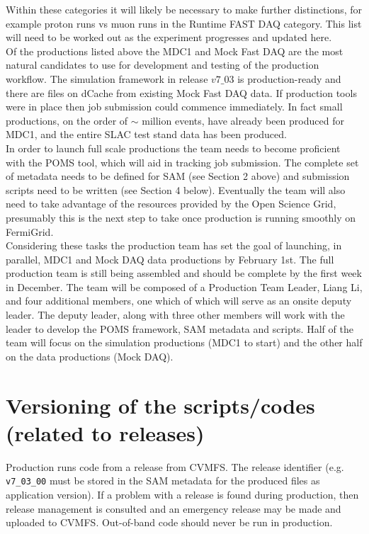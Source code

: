 \noindent Within these categories it will likely be necessary to make further distinctions, for example proton runs vs muon runs in the Runtime FAST DAQ category. This list will need to be worked out as the experiment progresses and updated here.\\

\noindent Of the productions listed above the MDC1 and Mock Fast DAQ are the most natural candidates to use for development and testing of the production workflow. The simulation framework in release $v7\_03$ is  production-ready and there are files on dCache from existing Mock Fast DAQ data.  If production tools were in place then job submission could commence immediately.  In  fact small productions, on the order of $\sim$ million events,  have already been produced for MDC1, and the entire SLAC test stand data has been produced.\\

\noindent In order to launch full scale productions the team needs to become proficient with the POMS tool, which will aid in tracking job submission.  The complete set of metadata needs to be defined for SAM (see Section 2 above) and submission scripts need to be written (see Section 4 below).  Eventually the team will also need to take advantage of the resources provided by the Open Science Grid, presumably this is the next step to take once production is running smoothly on FermiGrid.\\

\noindent Considering these tasks   the production team has set the goal of launching, in parallel, MDC1 and Mock DAQ data productions by February 1st.  The full production team is still being assembled and should be complete by the first week in December. The team will be composed of a Production Team Leader, Liang Li,  and four additional members, one which of which will serve as an onsite deputy leader.  The deputy leader, along with three other members will work with the leader to develop the POMS framework, SAM metadata and scripts. Half of the team will focus on the simulation productions (MDC1 to start) and the other half on the data productions (Mock DAQ).      

\section{Versioning of the scripts/codes (related to releases)}

\noindent Production runs code from a release from CVMFS. The release identifier (e.g. {\tt v7\_03\_00} must be stored in the SAM metadata for the produced files as application version). If a problem with a release is found during production, then release management is consulted and an emergency release may be made and uploaded to CVMFS. Out-of-band code should never be run in production. \\

